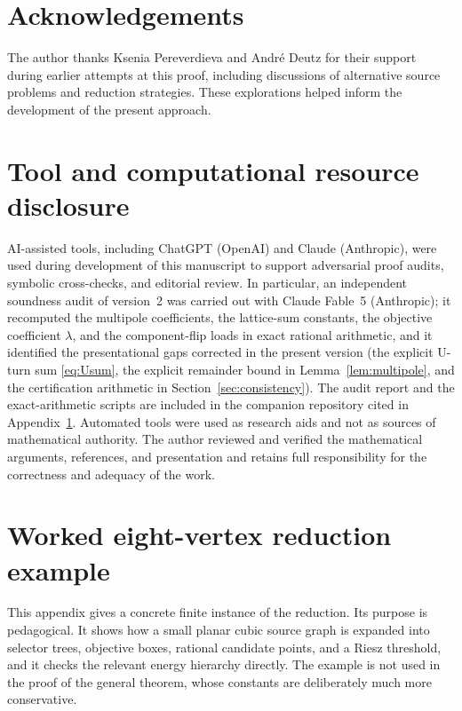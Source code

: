 \documentclass[12pt,a4paper]{article}
\begin{document}
\section*{Acknowledgements}
The author thanks Ksenia Pereverdieva and André Deutz for their support during earlier attempts at this proof, including discussions of alternative source problems and reduction strategies. These explorations helped inform the development of the present approach.

\section*{Tool and computational resource disclosure}
AI-assisted tools, including ChatGPT (OpenAI) and Claude (Anthropic), were used during development of this manuscript to support adversarial proof audits, symbolic cross-checks, and editorial review.  In particular, an independent soundness audit of version~2 was carried out with Claude Fable~5 (Anthropic); it recomputed the multipole coefficients, the lattice-sum constants, the objective coefficient $\lambda$, and the component-flip loads in exact rational arithmetic, and it identified the presentational gaps corrected in the present version (the explicit U-turn sum \eqref{eq:Usum}, the explicit remainder bound in Lemma~\ref{lem:multipole}, and the certification arithmetic in Section~\ref{sec:consistency}).  The audit report and the exact-arithmetic scripts are included in the companion repository cited in Appendix~\ref{app:cube-example}.  Automated tools were used as research aids and not as sources of mathematical authority.  The author reviewed and verified the mathematical arguments, references, and presentation and retains full responsibility for the correctness and adequacy of the work.

\appendix

\section{Worked eight-vertex reduction example}\label{app:cube-example}

This appendix gives a concrete finite instance of the reduction.  Its purpose is pedagogical.  It shows how a small planar cubic source graph is expanded into selector trees, objective boxes, rational candidate points, and a Riesz threshold, and it checks the relevant energy hierarchy directly.  The example is not used in the proof of the general theorem, whose constants are deliberately much more conservative.
\end{document}

